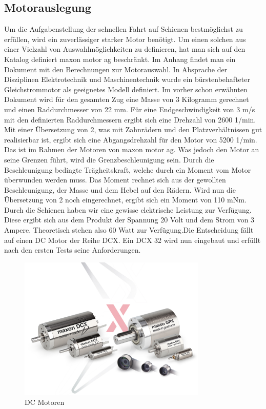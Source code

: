 \documentclass[../../main.tex]{subfiles}
\begin{document}
    \subsection{Motorauslegung}
          Um die Aufgabenstellung der schnellen Fahrt auf Schienen bestmöglichst zu erfüllen, wird ein zuverlässiger
          starker Motor benötigt. Um einen solchen aus einer Vielzahl von Auswahlmöglichkeiten zu definieren, hat man
          sich auf den Katalog definiert maxon motor ag beschränkt. Im Anhang findet man ein Dokument mit den
          Berechnungen zur Motorauswahl. In Absprache der Disziplinen Elektrotechnik und Maschinentechnik wurde ein
          bürstenbehafteter Gleichstrommotor als geeignetes Modell definiert. Im vorher schon erwähnten Dokument wird für
          den gesamten Zug eine Masse von 3 Kilogramm gerechnet und einen Raddurchmesser von 22 mm. Für eine
          Endgeschwindigkeit von 3 m/s mit den definierten Raddurchmessern ergibt sich eine Drehzahl von 2600 1/min. Mit
          einer Übersetzung von 2, was mit Zahnrädern und den Platzverhältnissen gut realisierbar ist, ergibt sich eine
          Abgangsdrehzahl für den Motor von 5200 1/min. Das ist im Rahmen der Motoren von maxon motor ag. Was jedoch den
          Motor an seine Grenzen führt, wird die Grenzbeschleunigung sein. Durch die Beschleunigung bedingte
          Trägheitskraft, welche durch ein Moment vom Motor überwunden werden muss. Das Moment rechnet sich aus der
          gewollten Beschleunigung, der Masse und dem Hebel auf den Rädern. Wird nun die Übersetzung von 2 noch
          eingerechnet, ergibt sich ein Moment von 110 mNm. Durch die Schienen haben wir eine gewisse elektrische
          Leistung zur Verfügung. Diese ergibt sich aus dem Produkt der Spannung 20 Volt und dem Strom von 3 Ampere.
          Theoretisch stehen also 60
          Watt zur Verfügung.Die Entscheidung fällt auf einen DC Motor der Reihe DCX. Ein DCX 32 wird nun eingebaut und erfüllt nach den ersten Tests seine Anforderungen.

    \begin{figure}[H]
        \centering
        \includegraphics[width=0.8\textwidth]{Kran/Motors.JPG}
        \caption {DC Motoren}
    \end{figure}
\end{document}
